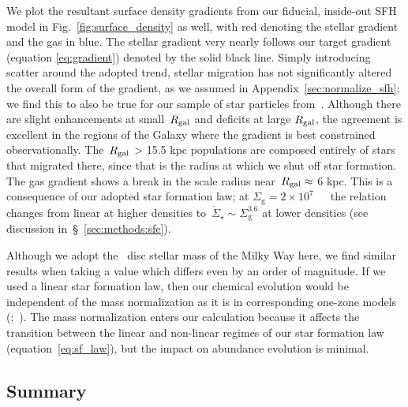 \documentclass[draft2.tex]{subfiles}
\begin{document}
We plot the resultant surface density gradients from our fiducial, inside-out 
SFH model in Fig.~\ref{fig:surface_density} as well, with red denoting the 
stellar gradient and the gas in blue. 
The stellar gradient very nearly follows our target gradient (equation 
\ref{eq:gradient}) denoted by the solid black line. 
{\color{red} 
Simply introducing scatter around the adopted trend, stellar migration has 
not significantly altered the overall form of the gradient, as we assumed in 
Appendix~\ref{sec:normalize_sfh}; we find this to also be true for our sample 
of star particles from~\hsim. 
}
Although there are slight enhancements at small~$R_\text{gal}$ and deficits at large 
$R_\text{gal}$, the agreement is excellent in the regions of the Galaxy where the 
gradient is best constrained observationally. 
The~$R_\text{gal}$ > 15.5 kpc populations are composed entirely of stars that 
migrated there, since that is the radius at which we shut off star formation. 
The gas gradient shows a break in the scale radius near~$R_\text{gal} \approx$ 
6 kpc. This is a consequence of our adopted star formation law; at 
$\Sigma_\text{g} = 2\times10^7$~\msun~\persqkpc~the relation changes from 
linear at higher densities to~$\dot{\Sigma}_\star \sim \Sigma_\text{g}^{3.6}$ 
at lower densities (see discussion in~\S~\ref{sec:methods:sfe}). 
\par 
Although we adopt the~\citet{Licquia2015} disc stellar mass of the Milky Way 
here, we find similar results when taking a value which differs even by an 
order of magnitude. 
If we used a linear star formation law, then our chemical evolution would be 
independent of the mass normalization as it is in corresponding one-zone 
models (\citealp*{Spitoni2017};~\citealp{Weinberg2017, Belfiore2019}). 
The mass normalization enters our calculation because it affects the transition 
between the linear and non-linear regimes of our star formation law 
(equation~\ref{eq:sf_law}), but the impact on abundance evolution is minimal. 

\subsection{Summary} 
\label{sec:methods:summary} 
\end{document}
